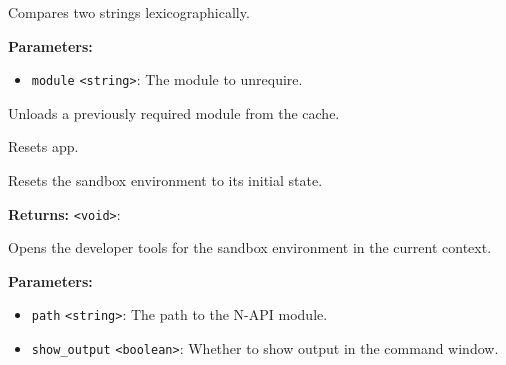 \documentclass[12pt,a4paper]{article}
\begin{document}
\noindent Compares two strings lexicographically.

\vspace{5mm}
\noindent {}


\noindent \textbf{Parameters:}
\begin{itemize}
  \item \texttt{module} \texttt{<string>}: The module to unrequire.
\end{itemize}

\noindent Unloads a previously required module from the cache.

\vspace{5mm}
\noindent {}


\noindent Resets app.

\vspace{5mm}
\noindent {}


\noindent Resets the sandbox environment to its initial state.

\vspace{5mm}
\noindent {}


\noindent \textbf{Returns:} \texttt{<void>}: 

\noindent Opens the developer tools for the sandbox environment in the current context.

\vspace{5mm}
\noindent {}


\noindent \textbf{Parameters:}
\begin{itemize}
  \item \texttt{path} \texttt{<string>}: The path to the N-API module.
  \item \texttt{show\_output} \texttt{<boolean>}: Whether to show output in the command window.
\end{itemize}
\end{document}
